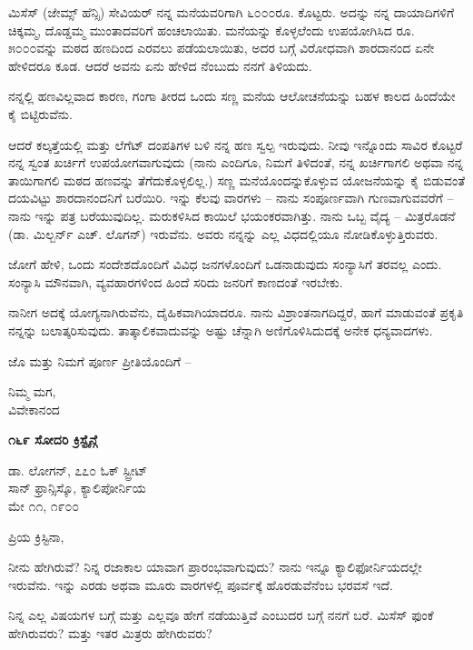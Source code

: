 ಮಿಸೆಸ್ (ಜೇಮ್ಸ್ ಹೆನ್ಸಿ) ಸೇವಿಯರ್ ನನ್ನ ಮನೆಯವರಿಗಾಗಿ ೬೦೦೦ರೂ. ಕೊಟ್ಟರು. ಅದನ್ನು ನನ್ನ ದಾಯಾದಿಗಳಿಗೆ ಚಿಕ್ಕಮ್ಮ, ದೊಡ್ಡಮ್ಮ ಮುಂತಾದವರಿಗೆ ಹಂಚಲಾಯಿತು. ಮನೆಯನ್ನು ಕೊಳ್ಳಲೆಂದು ಉಪಯೋಗಿಸಿದ ರೂ. ೫೦೦೦ವನ್ನು ಮಠದ ಹಣದಿಂದ ಎರವಲು ಪಡೆಯಲಾಯಿತು, ಅದರ ಬಗ್ಗೆ ವಿರೋಧವಾಗಿ ಶಾರದಾನಂದ ಏನೇ ಹೇಳಿದರೂ ಕೂಡ. ಆದರೆ ಅವನು ಏನು ಹೇಳಿದ ನೆಂಬುದು ನನಗೆ ತಿಳಿಯದು.

ನನ್ನಲ್ಲಿ ಹಣವಿಲ್ಲವಾದ ಕಾರಣ, ಗಂಗಾ ತೀರದ ಒಂದು ಸಣ್ಣ ಮನೆಯ ಆಲೋಚನೆಯನ್ನು ಬಹಳ ಕಾಲದ ಹಿಂದೆಯೇ ಕೈ ಬಿಟ್ಟಿರುವೆನು.

ಆದರೆ ಕಲ್ಕತ್ತೆಯಲ್ಲಿ ಮತ್ತು ಲೆಗೆಟ್ ದಂಪತಿಗಳ ಬಳಿ ನನ್ನ ಹಣ ಸ್ವಲ್ಪ ಇರುವುದು. ನೀವು ಇನ್ನೊಂದು ಸಾವಿರ ಕೊಟ್ಟರೆ ನನ್ನ ಸ್ವಂತ ಖರ್ಚಿಗೆ ಉಪಯೋಗವಾಗುವುದು (ನಾನು ಎಂದಿಗೂ, ನಿಮಗೆ ತಿಳಿದಂತೆ, ನನ್ನ ಖರ್ಚಿಗಾಗಲಿ ಅಥವಾ ನನ್ನ ತಾಯಿಗಾಗಲಿ ಮಠದ ಹಣವನ್ನು ತೆಗೆದುಕೊಳ್ಳಲಿಲ್ಲ.) ಸಣ್ಣ ಮನೆಯೊಂದನ್ನುಕೊಳ್ಳುವ ಯೋಜನೆಯನ್ನು ಕೈ ಬಿಡುವಂತೆ ದಯವಿಟ್ಟು ಶಾರದಾನಂದನಿಗೆ ಬರೆಯಿರಿ. ಇನ್ನು ಕೆಲವು ವಾರಗಳು – ನಾನು ಸಂಪೂರ್ಣವಾಗಿ ಗುಣವಾಗುವವರೆಗೆ – ನಾನು ಇನ್ನು ಪತ್ರ ಬರೆಯುವುದಿಲ್ಲ. ಮರುಕಳಿಸಿದ ಕಾಯಿಲೆ ಭಯಂಕರವಾಗಿತ್ತು. ನಾನು ಒಬ್ಬ ವೈದ್ಯ – ಮಿತ್ರರೊಡನೆ (ಡಾ. ಮಿಲ್ಬರ್ನ್ ಎಚ್. ಲೊಗನ್) ಇರುವೆನು. ಅವರು ನನ್ನನ್ನು ಎಲ್ಲ ವಿಧದಲ್ಲಿಯೂ ನೋಡಿಕೊಳ್ಳುತ್ತಿರುವರು.

ಜೋಗೆ ಹೇಳಿ, ಒಂದು ಸಂದೇಶದೊಂದಿಗೆ ವಿವಿಧ ಜನಗಳೊಂದಿಗೆ ಒಡನಾಡುವುದು ಸಂನ್ಯಾಸಿಗೆ ತರವಲ್ಲ ಎಂದು. ಸಂನ್ಯಾಸಿ ಮೌನವಾಗಿ, ವ್ಯವಹಾರಗಳಿಂದ ಹಿಂದೆ ಸರಿದು ಜನರಿಗೆ ಕಾಣದಂತೆ ಇರಬೇಕು.

ನಾನೀಗ ಅದಕ್ಕೆ ಯೋಗ್ಯನಾಗಿರುವೆನು, ದೈಹಿಕವಾಗಿಯಾದರೂ. ನಾನು ವಿಶ್ರಾಂತನಾಗದಿದ್ದರೆ, ಹಾಗೆ ಮಾಡುವಂತೆ ಪ್ರಕೃತಿ ನನ್ನನ್ನು ಬಲಾತ್ಕರಿಸುವುದು. ತಾತ್ಕಾಲಿಕವಾದುವನ್ನು ಅಷ್ಟು ಚೆನ್ನಾಗಿ ಅಣಿಗೊಳಿಸಿದುದಕ್ಕೆ ಅನೇಕ ಧನ್ಯವಾದಗಳು.

ಜೊ ಮತ್ತು ನಿಮಗೆ ಪೂರ್ಣ ಪ್ರೀತಿಯೊಂದಿಗೆ –

\begin{flushright}
ನಿಮ್ಮ ಮಗ,\\ವಿವೇಕಾನಂದ
\end{flushright}

\begin{center}
\textbf{೧೬೯ ಸೋದರಿ ಕ್ರಿಸ್ಟೈನ್ಗೆ}
\end{center}

\begin{flushright}
 ಡಾ. ಲೋಗನ್, ೭೭೦ ಓಕ್ ಸ್ಟ್ರೀಟ್\\ಸಾನ್ ಫ್ರಾನ್ಸಿಸ್ಕೊ, ಕ್ಯಾಲಿಪೋರ್ನಿಯ\\ಮೇ ೧೧, ೧೯೦೦
\end{flushright}

ಪ್ರಿಯ ಕ್ರಿಸ್ಟಿನಾ,

ನೀನು ಹೇಗಿರುವೆ? ನಿನ್ನ ರಜಾಕಾಲ ಯಾವಾಗ ಪ್ರಾರಂಭವಾಗುವುದು? ನಾನು ಇನ್ನೂ ಕ್ಯಾಲಿಫೋರ್ನಿಯದಲ್ಲೇ ಇರುವೆನು. ಇನ್ನು ಎರಡು ಅಥವಾ ಮೂರು ವಾರಗಳಲ್ಲಿ ಪೂರ್ವಕ್ಕೆ ಹೊರಡುವೆನೆಂಬ ಭರವಸೆ ಇದೆ.

ನಿನ್ನ ಎಲ್ಲ ವಿಷಯಗಳ ಬಗ್ಗೆ ಮತ್ತು ಎಲ್ಲವೂ ಹೇಗೆ ನಡೆಯುತ್ತಿವೆ ಎಂಬುದರ ಬಗ್ಗೆ ನನಗೆ ಬರೆ. ಮಿಸೆಸ್ ಫುಂಕೆ ಹೇಗಿರುವರು? ಮತ್ತು ಇತರ ಮಿತ್ರರು ಹೇಗಿರುವರು?

